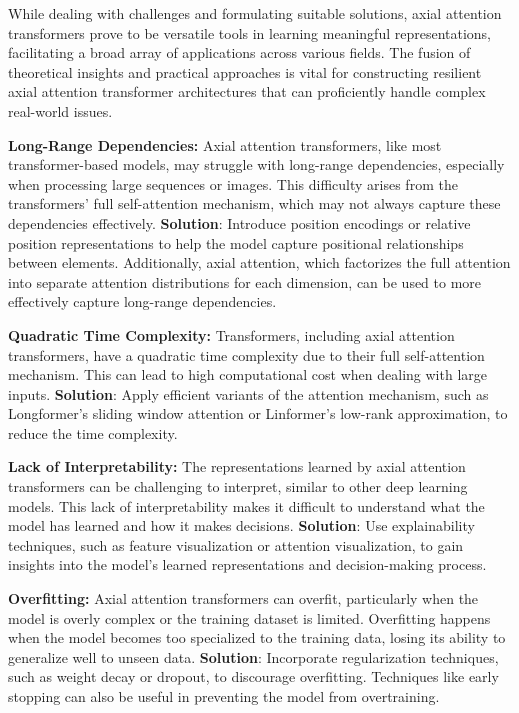 While dealing with challenges and formulating suitable solutions, axial attention transformers prove to be versatile tools in learning meaningful representations, facilitating a broad array of applications across various fields. The fusion of theoretical insights and practical approaches is vital for constructing resilient axial attention transformer architectures that can proficiently handle complex real-world issues.

\begin{list}{}{}
    \item \textbf{Long-Range Dependencies:}
    Axial attention transformers, like most transformer-based models, may struggle with long-range dependencies, especially when processing large sequences or images. This difficulty arises from the transformers' full self-attention mechanism, which may not always capture these dependencies effectively. \textbf{Solution}: Introduce position encodings or relative position representations to help the model capture positional relationships between elements. Additionally, axial attention, which factorizes the full attention into separate attention distributions for each dimension, can be used to more effectively capture long-range dependencies.
    
    \item \textbf{Quadratic Time Complexity:}
    Transformers, including axial attention transformers, have a quadratic time complexity due to their full self-attention mechanism. This can lead to high computational cost when dealing with large inputs. \textbf{Solution}: Apply efficient variants of the attention mechanism, such as Longformer's sliding window attention or Linformer's low-rank approximation, to reduce the time complexity.
    
    \item \textbf{Lack of Interpretability:}
    The representations learned by axial attention transformers can be challenging to interpret, similar to other deep learning models. This lack of interpretability makes it difficult to understand what the model has learned and how it makes decisions. \textbf{Solution}: Use explainability techniques, such as feature visualization or attention visualization, to gain insights into the model's learned representations and decision-making process.
    
    \item \textbf{Overfitting:}
    Axial attention transformers can overfit, particularly when the model is overly complex or the training dataset is limited. Overfitting happens when the model becomes too specialized to the training data, losing its ability to generalize well to unseen data. \textbf{Solution}: Incorporate regularization techniques, such as weight decay or dropout, to discourage overfitting. Techniques like early stopping can also be useful in preventing the model from overtraining.
    

\end{list}
